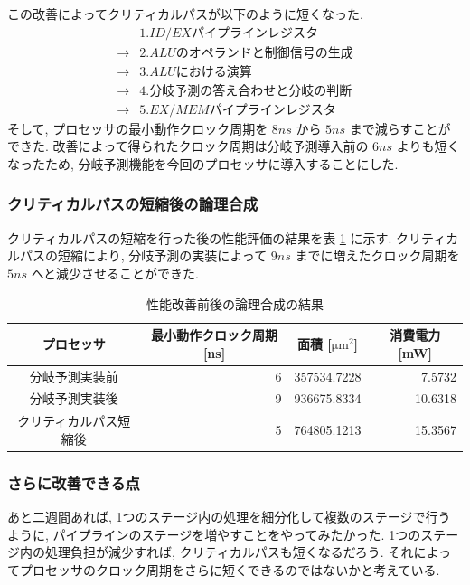 \documentclass[../improvements.tex]{subfiles}
\begin{document}
  この改善によってクリティカルパスが以下のように短くなった. 
  \begin{displaymath}
    \begin{aligned}
      &1. ID/EX パイプラインレジスタ \\
      \rightarrow &2. ALU のオペランドと制御信号の生成 \\
      \rightarrow &3. ALU における演算 \\
      \rightarrow &4. 分岐予測の答え合わせと分岐の判断 \\
      \rightarrow &5. EX/MEM パイプラインレジスタ
    \end{aligned}
  \end{displaymath}
  そして, プロセッサの最小動作クロック周期を $8\unit{ns}$ から $5\unit{ns}$ まで減らすことができた.
  改善によって得られたクロック周期は分岐予測導入前の $6\unit{ns}$ よりも短くなったため, 
  分岐予測機能を今回のプロセッサに導入することにした.

  \subsubsection{クリティカルパスの短縮後の論理合成}
  クリティカルパスの短縮を行った後の性能評価の結果を表 \ref{table:logic-synthesis-improved} に示す.
  クリティカルパスの短縮により, 分岐予測の実装によって $9\unit{ns}$ までに増えたクロック周期を
  $5\unit{ns}$ へと減少させることができた.

  \begin{table}[t]
    \centering
    \begin{tabular}{|c|r|r|r|}
    \hline
    プロセッサ & \multicolumn{1}{c|}{最小動作クロック周期 {[}\unit{ns}{]}} & \multicolumn{1}{c|}{面積 {[}$\unit{\um}^2${]}} & \multicolumn{1}{c|}{消費電力 {[}\unit{\mW}{]}} \\ \hline
    分岐予測実装前 & 6 & 357534.7228 & 7.5732 \\
    分岐予測実装後 & 9 & 936675.8334 & 10.6318 \\
    クリティカルパス短縮後 & 5 & 764805.1213 & 15.3567 \\ \hline
    \end{tabular}
    \caption{性能改善前後の論理合成の結果}
    \label{table:logic-synthesis-improved}
  \end{table}

  \subsubsection{さらに改善できる点}
  あと二週間あれば, 1つのステージ内の処理を細分化して複数のステージで行うように, 
  パイプラインのステージを増やすことをやってみたかった.
  1つのステージ内の処理負担が減少すれば, クリティカルパスも短くなるだろう.
  それによってプロセッサのクロック周期をさらに短くできるのではないかと考えている.
\end{document}
